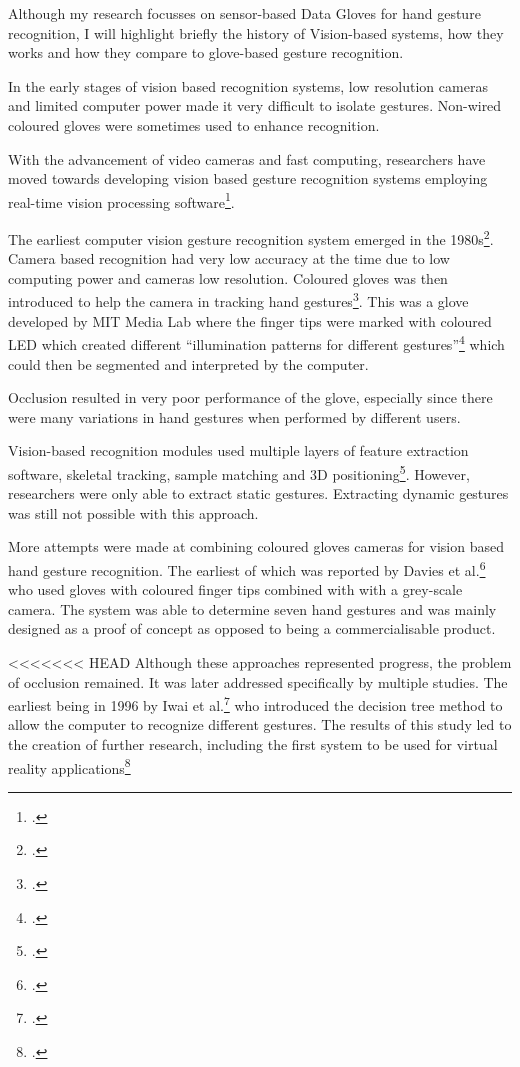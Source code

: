 Although my research focusses on sensor-based Data Gloves for hand gesture recognition, I will highlight briefly the history of Vision-based systems, how they works and how they compare to glove-based gesture recognition.

In the early stages of vision based recognition systems, low resolution cameras and limited computer power made it very difficult to isolate gestures. Non-wired coloured gloves were sometimes used to enhance recognition.

With the advancement of video cameras and fast computing, researchers have moved towards developing vision based gesture recognition systems employing real-time vision processing software\footcite{Pavlovic1997}.

The earliest computer vision gesture recognition system emerged in the 1980s\footcite{Premaratne2010}. Camera based recognition had very low accuracy at the time due to low computing power and cameras low resolution. Coloured gloves was then introduced to help the camera in tracking hand gestures\footcite{James1994}. This was a glove developed by MIT Media Lab where the finger tips were marked with coloured LED which created different ``illumination patterns for different gestures''\footcite{Sturman1994} which could then be segmented and interpreted by the computer.

Occlusion resulted in very poor performance of the glove, especially since there were many variations in hand gestures when performed by different users.

Vision-based recognition modules used multiple layers of feature extraction software, skeletal tracking, sample matching and 3D positioning\footcite{Berci2007}. However, researchers were only able to extract static gestures. Extracting dynamic gestures was still not possible with this approach.

More attempts were made at combining coloured gloves cameras for vision based hand gesture recognition. The earliest of which was reported by Davies et al.\footcite{James1994} who used gloves with coloured finger tips combined with with a grey-scale camera. The system was able to determine seven hand gestures and was mainly designed as a proof of concept as opposed to being a commercialisable product.

<<<<<<< HEAD
Although these approaches represented progress, the problem of occlusion remained. It was later addressed specifically by multiple studies. The earliest being in 1996 by Iwai et al.\footcite{Iwai1996} who introduced the decision tree method to allow the computer to recognize different gestures. The results of this study led to the creation of further research, including the first system to be used for virtual reality applications\footcite{Wang2009}

